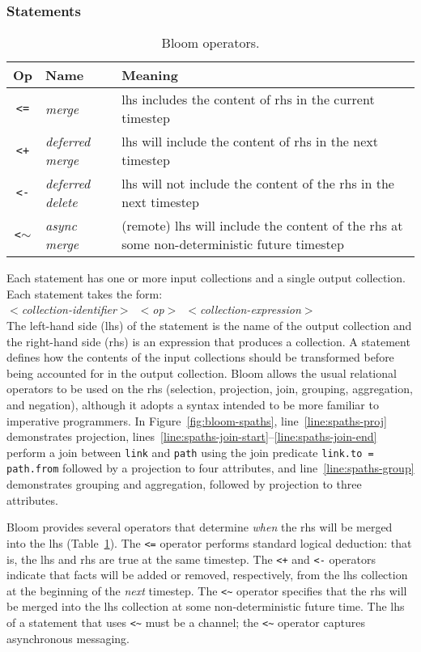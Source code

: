 \subsubsection{Statements}
\begin{table}
\begin{tabular}{|c|l|p{1.85in}|}
\hline
\textbf{Op} & \textbf{Name} & \textbf{Meaning} \\
\hline
\verb|<=| & \emph{merge} & lhs includes the content of rhs in the
current timestep \\
\hline
\verb|<+| & \emph{deferred merge} & lhs will include the content of rhs in the
next timestep \\
\hline
\verb|<-| & \emph{deferred delete} & lhs will not include the content of the rhs
in the next timestep \\
\hline
\verb|<|$\sim$ & \emph{async merge} & (remote) lhs will include the content of the
rhs at some non-deterministic future timestep\\
\hline
\end{tabular}
\caption{Bloom operators.}
\label{tbl:bloom-ops}
\end{table}

Each statement has one or more input collections and a single output
collection.  Each statement takes the form: \\ \noindent
\mbox{\hspace{0.25in}\emph{$<$collection-identifier$>$ $<$op$>$
    $<$collection-expression$>$}}\\ \noindent
The left-hand side (lhs) of the statement is the name of the output collection
and the right-hand side (rhs) is an expression that produces a collection.
A statement defines how the contents of the input collections should
be transformed before being accounted for in the output
collection. Bloom
allows the usual relational operators to be used on the rhs (selection,
projection, join, grouping, aggregation, and negation), although it adopts a
syntax intended to be more familiar to imperative programmers. In
Figure~\ref{fig:bloom-spaths}, line~\ref{line:spaths-proj} demonstrates projection,
lines~\ref{line:spaths-join-start}--\ref{line:spaths-join-end} perform a join
between \texttt{link} and \texttt{path} using the join predicate
\verb+link.to = path.from+ followed by a projection to four attributes, and line~\ref{line:spaths-group} demonstrates
grouping and aggregation, followed by projection to three attributes.

Bloom provides several operators that determine \emph{when} the rhs will be
merged into the lhs (Table~\ref{tbl:bloom-ops}). The \verb|<=| operator performs
standard logical deduction: that is, the lhs and rhs are true at the same
timestep. The \verb|<+| and \verb|<-| operators indicate that facts will be
added or removed, respectively, from the lhs collection at the beginning of the
{\em next} timestep. The \verb+<~+ operator specifies that the rhs will be merged into
the lhs collection at some non-deterministic future time. The lhs of a statement
that uses \verb+<~+ must be a channel; the \verb+<~+ operator captures
asynchronous messaging.

